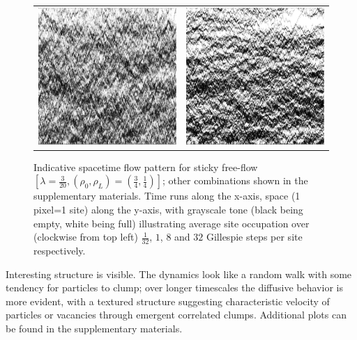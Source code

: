 \documentclass[
reprint, amsmath,amssymb, aps,
 prx,
]{revtex4-1}
\begin{document}
\begin{figure}[h!]
\begin{center}
\begin{tabular}{c | c}
    \includegraphics[width=0.49\linewidth]{longTime} &\includegraphics[width=0.49\linewidth]{midLongTime}
    \end{tabular}
\end{center}
\caption{\label{fig:flowPatterns} 
Indicative spacetime flow pattern for sticky free-flow $\left[\lambda = \frac{3}{20}, (\rho_0, \rho_L) = (\frac{3}{4}, \frac{1}{4})\right]$; other combinations shown in the supplementary materials.
Time runs along the x-axis, space (1 pixel=1 site) along the y-axis, with grayscale tone (black being empty, white being full) illustrating average site occupation over (clockwise from top left) $\frac{1}{32}$, $1$, $8$ and $32$ Gillespie steps per site respectively.}
\end{figure}

Interesting structure is visible. The dynamics look like a random walk with
some tendency for particles to clump; over longer timescales the
diffusive behavior is more evident, with a textured structure
suggesting characteristic velocity of particles or vacancies through
emergent correlated clumps.  Additional plots can be found in the
supplementary materials.
\end{document}
